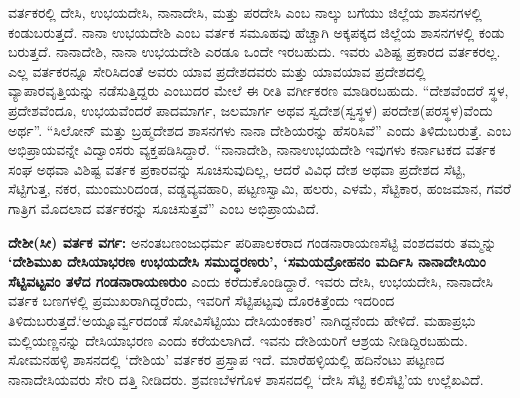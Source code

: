 ವರ್ತಕರಲ್ಲಿ ದೇಸಿ, ಉಭಯದೇಸಿ, ನಾನಾದೇಸಿ, ಮತ್ತು ಪರದೇಸಿ ಎಂಬ ನಾಲ್ಕು ಬಗೆಯು ಜಿಲ್ಲೆಯ ಶಾಸನಗಳಲ್ಲಿ ಕಂಡುಬರುತ್ತದೆ. ನಾನಾ ಉಭಯದೇಶಿ ಎಂಬ ವರ್ತಕ ಸಮೂಹವು ಹೆಚ್ಚಾಗಿ ಅಕ್ಕಪಕ್ಕದ ಜಿಲ್ಲೆಯ ಶಾಸನಗಳಲ್ಲಿ ಕಂಡು ಬರುತ್ತದೆ. ನಾನಾದೇಶಿ, ನಾನಾ ಉಭಯದೇಶಿ ಎರಡೂ ಒಂದೇ ಇರಬಹುದು. ಇವರು ವಿಶಿಷ್ಟ ಪ್ರಕಾರದ ವರ್ತಕರಲ್ಲ. ಎಲ್ಲ ವರ್ತಕರನ್ನೂ ಸೇರಿಸಿದಂತೆ ಅವರು ಯಾವ ಪ್ರದೇಶದವರು ಮತ್ತು ಯಾವಯಾವ ಪ್ರದೇಶದಲ್ಲಿ ವ್ಯಾಪಾರವೃತ್ತಿಯನ್ನು ನಡೆಸುತ್ತಿದ್ದರು ಎಂಬುದರ ಮೇಲೆ ಈ ರೀತಿ ವರ್ಗೀಕರಣ ಮಾಡಿರಬಹುದು. “ದೇಶವೆಂದರೆ ಸ್ಥಳ, ಪ್ರದೇಶವೆಂದೂ, ಉಭಯವೆಂದರೆ ಪಾದಮಾರ್ಗ, ಜಲಮಾರ್ಗ ಅಥವ ಸ್ವದೇಶ(ಸ್ವಸ್ಥಳ) ಪರದೇಶ(ಪರಸ್ಥಳ)ವೆಂದು ಅರ್ಥ”. “ಸಿಲೋನ್​ ಮತ್ತು ಬ್ರಹ್ಮದೇಶದ ಶಾಸನಗಳು ನಾನಾ ದೇಶಿಯರನ್ನು ಹೆಸರಿಸಿವೆ” ಎಂದು ತಿಳಿದುಬರುತ್ತೆ. ಎಂಬ ಅಭಿಪ್ರಾಯವನ್ನೇ ವಿದ್ವಾಂಸರು ವ್ಯಕ್ತಪಡಿಸಿದ್ದಾರೆ. “ನಾನಾದೇಶಿ, ನಾನಾಉಭಯದೇಶಿ ಇವುಗಳು ಕರ್ನಾಟಕದ ವರ್ತಕ ಸಂಘ ಅಥವಾ ವಿಶಿಷ್ಟ ವರ್ತಕ ಪ್ರಕಾರವನ್ನು ಸೂಚಿಸುವುದಿಲ್ಲ, ಆದರೆ ವಿವಿಧ ದೇಶ ಅಥವಾ ಪ್ರದೇಶದ ಸೆಟ್ಟಿ, ಸೆಟ್ಟಿಗುತ್ತ, ನಕರ, ಮುಂಮುರಿದಂಡ, ವಡ್ಡವ್ಯವಹಾರಿ, ಪಟ್ಟಣಸ್ವಾಮಿ, ಹಲರು, ಎಳಮೆ, ಸೆಟ್ಟಿಕಾರ, ಹಂಜಮಾನ, ಗವರೆ ಗಾತ್ರಿಗ ಮೊದಲಾದ ವರ್ತಕರನ್ನು ಸೂಚಿಸುತ್ತವೆ” ಎಂಬ ಅಭಿಪ್ರಾಯವಿದೆ.

\textbf{ದೇಶೀ(ಸೀ) ವರ್ತಕ ವರ್ಗ:} ಅನಂತಬಣಂಜುಧರ್ಮ ಪರಿಪಾಲಕರಾದ ಗಂಡನಾರಾಯಣಸೆಟ್ಟಿ ವಂಶದವರು ತಮ್ಮನ್ನು \textbf{‘ದೇಶಿಮುಖ ದೇಸಿಯಾಭರಣ ಉಭಯದೇಸಿ ಸಮುದ್ಧರಣರು’, ‘ಸಮಯದ್ರೋಹನಂ ಮರ್ದಿಸಿ ನಾನಾದೇಸಿಯಿಂ ಸೆಟ್ಟಿವಟ್ಟವಂ ತಳೆದ ಗಂಡನಾರಾಯಣರುಂ} ಎಂದು ಕರೆದುಕೊಂಡಿದ್ದಾರೆ. ಇವರು ದೇಸಿ, ಉಭಯದೇಸಿ, ನಾನಾದೇಸಿ ವರ್ತಕ ಬಣಗಳಲ್ಲಿ ಪ್ರಮುಖರಾಗಿದ್ದರೆಂದು, ಇವರಿಗೆ ಸೆಟ್ಟಿಪಟ್ಟವು ದೊರಕಿತ್ತೆಂದು ಇದರಿಂದ ತಿಳಿದುಬರುತ್ತದೆ.\break ‘ಅಯ್ನೂರ್ವ್ವರದಂಡೆ ಸೋವಿಸೆಟ್ಟಿಯು ದೇಸಿಯಂಕಕಾರ’ ನಾಗಿದ್ದನೆಂದು ಹೇಳಿದೆ. ಮಹಾಪ್ರಭು ಮಲ್ಲಿಯಣ್ಣನನ್ನು ದೇಸಿಯಾಭರಣ ಎಂದು ಕರೆಯಲಾಗಿದೆ. ಇವನು ದೇಶಿಯರಿಗೆ ಆಶ್ರಯ ನೀಡಿದ್ದಿರಬಹುದು. ಸೋಮನಹಳ್ಳಿ ಶಾಸನದಲ್ಲಿ ‘ದೇಶಿಯ’ ವರ್ತಕರ ಪ್ರಸ್ತಾಪ ಇದೆ. ಮಾರೆಹಳ್ಳಿಯಲ್ಲಿ ಹದಿನೆಂಟು ಪಟ್ಟಣದ ನಾನಾದೇಸಿಯವರು ಸೇರಿ ದತ್ತಿ ನೀಡಿದರು. ಶ್ರವಣಬೆಳಗೊಳ ಶಾಸನದಲ್ಲಿ ‘ದೇಸಿ ಸೆಟ್ಟಿ ಕಲಿಸೆಟ್ಟಿ’ಯ ಉಲ್ಲೆಖವಿದೆ.

